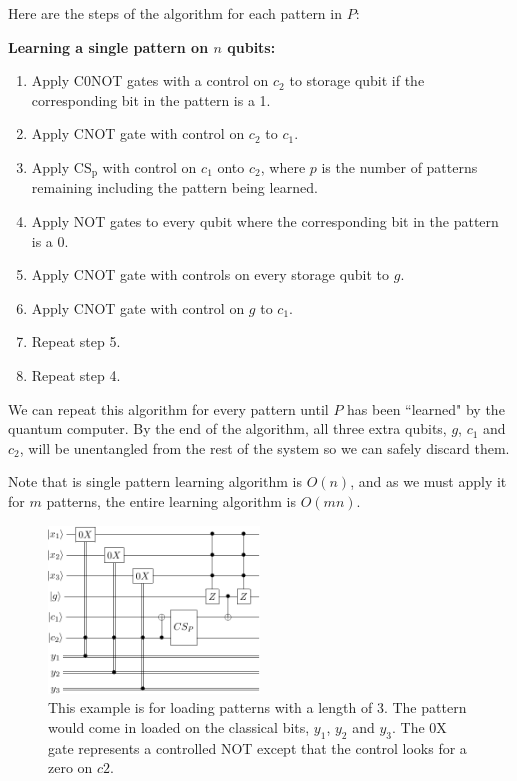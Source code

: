 \documentclass[11pt]{report}
\newcommand{\?}{\stackrel{?}{=}}
\begin{document}
Here are the steps of the algorithm for each pattern in $P$:

\begin{framed}
\textbf{Learning a single pattern on $n$ qubits:}
\begin{enumerate}
	\item Apply C0NOT gates with a control on $c_2$ to storage qubit if the corresponding bit in the pattern is a 1.
	\item Apply CNOT gate with control on $c_2$ to $c_1$.
	\item Apply $\mathrm{CS_p}$ with control on $c_1$ onto $c_2$, where $p$ is the number of patterns remaining including the pattern being learned.
	\item Apply NOT gates to every qubit where the corresponding bit in the pattern is a 0.
	\item Apply CNOT gate with controls on every storage qubit to $g$.
	\item Apply CNOT gate with control on $g$ to $c_1$.
	\item Repeat step 5.
	\item Repeat step 4.
\end{enumerate}
\end{framed}

We can repeat this algorithm for every pattern until $P$ has been ``learned" by the quantum computer. By the end of the algorithm, all three extra qubits, $g$, $c_1$ and $c_2$, will be unentangled from the rest of the system so we can safely discard them.

Note that is single pattern learning algorithm is $O(n)$, and as we must apply it for $m$ patterns, the entire learning algorithm is $O(mn)$.

\begin{figure}[!htb]
\centering
\includegraphics[width=0.5\textwidth]{resources/pdfs/assoc1-crop.pdf}
\caption{This example is for loading patterns with a length of 3. The pattern would come in loaded on the classical bits, $y_1$, $y_2$ and $y_3$. The 0X gate represents a controlled NOT except that the control looks for a zero on $c2$.}
\label{fig:digraph}
\end{figure}
\end{document}
